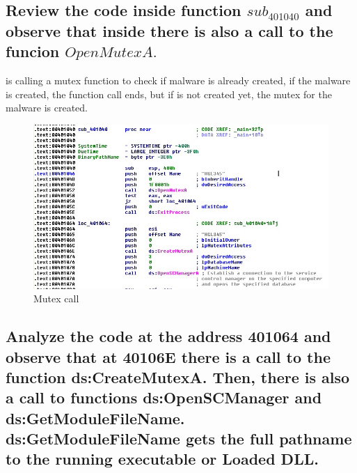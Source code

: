 \documentclass[10pt,a4paper]{article} %
\begin{document}
            \newpage
        \subsection{Review the code inside function $ sub_401040  $  and observe that
            inside there is also a call to the funcion $ OpenMutexA.  $ }

            is calling a mutex function to check if malware is already created,
            if the malware is created, the  function call ends, but if is not
            created yet, the mutex for the malware is created.
            \begin{figure}[h!]
                \centering
                \includegraphics[width=1\linewidth]{mutef.jpeg}
                \caption{Mutex call}
                \label{mutex}
            \end{figure}

        \newpage
        \subsection{Analyze the code at the address 401064 and observe that at
            40106E there is a call to the function ds:CreateMutexA. Then, there
            is also a call to functions ds:OpenSCManager and
            ds:GetModuleFileName. ds:GetModuleFileName gets the full pathname
            to the running executable or Loaded DLL.}
\end{document}
